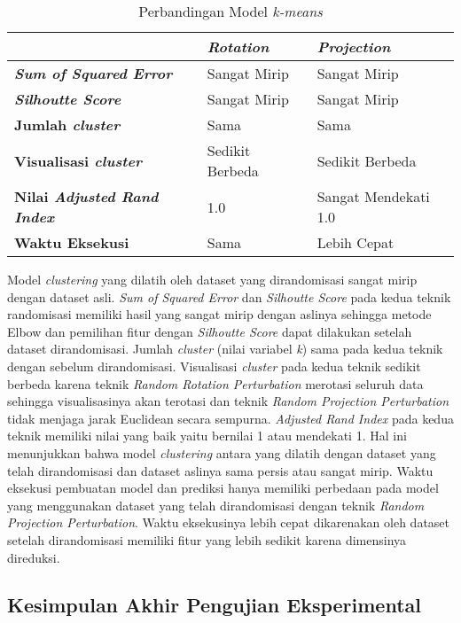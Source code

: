 \begin{table}
	\centering
	\caption{Perbandingan Model \textit{k-means}}
	\begin{tabular}{|l|l|l|}
		\hline
		& \textbf{\textit{Rotation}} & \textbf{\textit{Projection}} \\ \hline
		\textbf{\textit{Sum of Squared Error}} & Sangat Mirip & Sangat Mirip \\
		\textbf{\textit{Silhoutte Score}} & Sangat Mirip & Sangat Mirip \\
		\textbf{Jumlah \textit{cluster}} & Sama & Sama \\
		\textbf{Visualisasi \textit{cluster}} & Sedikit Berbeda & Sedikit Berbeda \\
		\textbf{Nilai \textit{Adjusted Rand Index}} & 1.0 & Sangat Mendekati 1.0 \\
		\textbf{Waktu Eksekusi} & Sama & Lebih Cepat \\
		\hline
	\end{tabular}
	\label{table:perbandingan-clustering}
\end{table}

Model \textit{clustering} yang dilatih oleh dataset yang dirandomisasi sangat mirip dengan dataset asli. \textit{Sum of Squared Error} dan \textit{Silhoutte Score} pada kedua teknik randomisasi memiliki hasil yang sangat mirip dengan aslinya sehingga metode Elbow dan pemilihan fitur dengan \textit{Silhoutte Score} dapat dilakukan setelah dataset dirandomisasi. Jumlah \textit{cluster} (nilai variabel \textit{k}) sama pada kedua teknik dengan sebelum dirandomisasi. Visualisasi \textit{cluster} pada kedua teknik sedikit berbeda karena teknik \textit{Random Rotation Perturbation} merotasi seluruh data sehingga visualisasinya akan terotasi dan teknik \textit{Random Projection Perturbation} tidak menjaga jarak Euclidean secara sempurna. \textit{Adjusted Rand Index} pada kedua teknik memiliki nilai yang baik yaitu bernilai 1 atau mendekati 1. Hal ini menunjukkan bahwa model \textit{clustering} antara yang dilatih dengan dataset yang telah dirandomisasi dan dataset aslinya sama persis atau sangat mirip. Waktu eksekusi pembuatan model dan prediksi hanya memiliki perbedaan pada model yang menggunakan dataset yang telah dirandomisasi dengan teknik \textit{Random Projection Perturbation}. Waktu eksekusinya lebih cepat dikarenakan oleh dataset setelah dirandomisasi memiliki fitur yang lebih sedikit karena dimensinya direduksi.

\subsection{Kesimpulan Akhir Pengujian Eksperimental}
\label{subsec:kesimpulan-eksperimental}

